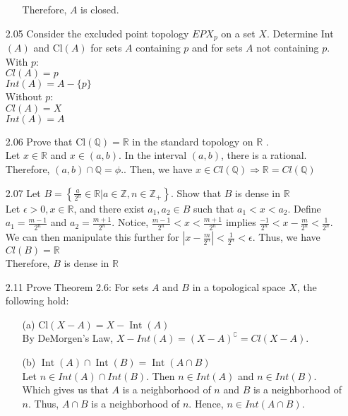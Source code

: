 \documentclass[12pt]{article}
\newcommand{\R}{\mathds{R}}
\begin{document}
\begin{enumerate}
\begin{enumerate}
				Therefore, $ A $ is closed.
		\end{enumerate}
	\item[2.05] Consider the excluded point topology $E P X _ { p }$ on a set $X$.
	Determine Int $( A )$ and $\mathrm { Cl } ( A )$ for sets $A$ containing $p$ and for sets $A$ not containing $p .$\\
	With $ p $:\\
		$ Cl(A) = p $\\
		$ Int(A) = A-\{p\}$\\
	Without $ p $:\\
		$ Cl(A) = X$\\
		$ Int(A) = A$\\
	\item[2.06] Prove that $\mathrm { Cl } ( \mathbb { Q } ) = \mathbb { R }$ in the standard topology on $\mathbb { R }$ .\\
		Let $ x\in\R $ and $ x\in(a,b) $. In the interval $ (a,b) $, there is a rational. Therefore, $ (a,b)\cap\mathds{Q}=\phi. $. Then, we have $ x\in Cl(\mathds{Q}) \Rightarrow \R = Cl(\mathds{Q})$
	\item[2.07] Let $B = \left\{ \frac { a } { 2 ^ { n } } \in \mathbb { R } | a \in \mathbb { Z } , n \in \mathbb { Z } _ { + } \right\} .$ Show that $B$ is dense in $\mathbb { R }$\\
		Let $ \epsilon > 0 , x\in \R $, and there exist $ a_1,a_2\in B $ such that $ a_1<x<a_2 $. Define $ a_1 = \frac{m-1}{2^n} $ and $ a_2=\frac{m+1}{2^n} $. Notice, $ \frac{m-1}{2^n} < x < \frac{m+1}{2^n} $ implies $ \frac{-1}{2^n} < x - \frac{m}{2^n} < \frac{1}{2^n}$. We can then manipulate this further for $ |x-\frac{m}{2^n} | < \frac{1}{2^n} < \epsilon$. Thus, we have $ Cl(B) = \R $\\
		Therefore, $ B $ is dense in $ \R $
	\item[2.11] 
	Prove Theorem 2.6: For sets $ A $ and $ B $ in a topological space $ X $, the following hold:
	\begin{enumerate}
		\item[(a)] $\mathrm { Cl } ( X - A ) = X - \operatorname { Int } ( A )$\\
			By DeMorgen's Law, $ X- Int(A) = (X - A)^\complement = Cl(X-A).$
		\item[(b)] $\operatorname { Int } ( A ) \cap \operatorname { Int } ( B ) = \operatorname { Int } ( A \cap B )$\\
			 Let $ n\in Int(A) \cap Int(B) $. Then $ n\in Int(A) $ and $ n\in Int(B) $. Which gives us that $ A $ is a neighborhood of $ n $ and $ B $ is a neighborhood of $ n $. Thus, $ A\cap B $ is a neighborhood of $ n $. Hence, $ n \in Int(A\cap B) $. \\

\end{enumerate}
\end{enumerate}
\end{document}
